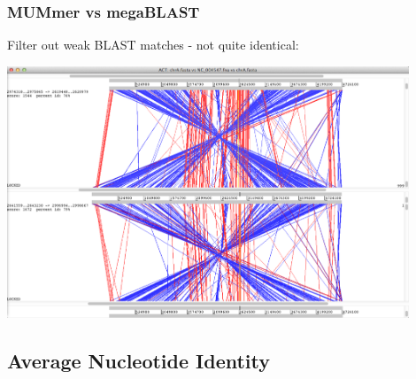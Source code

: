 \begin{frame}
  \frametitle{MUMmer vs megaBLAST}
  Filter out weak BLAST matches - not quite identical:
  \begin{center}
    \includegraphics[width=0.9\textwidth]{images/act_wgs10}
  \end{center}    
\end{frame}

\subsection{Average Nucleotide Identity}


